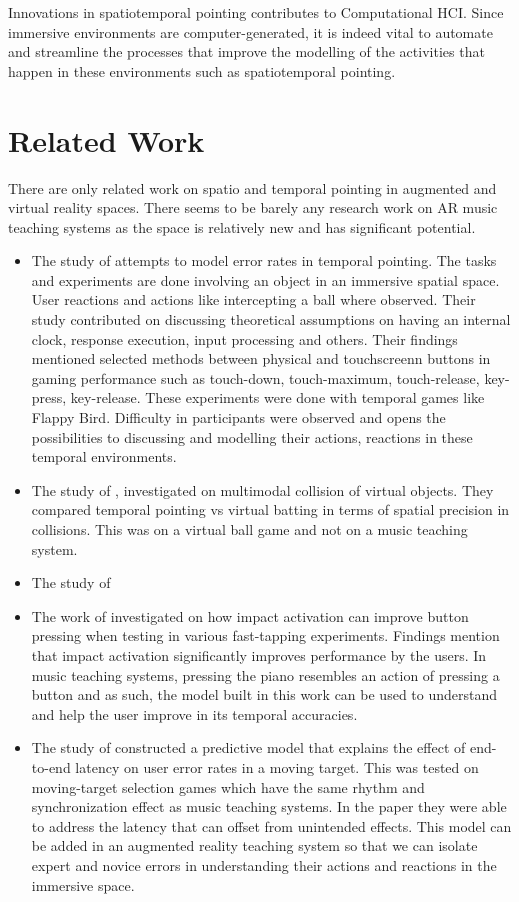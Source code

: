 \documentclass{article}
\begin{document}
Innovations in spatiotemporal pointing contributes to Computational HCI. Since immersive environments are computer-generated, it is indeed vital to automate and streamline the processes that improve the modelling of the activities that happen in these environments such as spatiotemporal pointing. 
\section{Related Work}
There are only related work on spatio and temporal pointing in augmented and virtual reality spaces. There seems to be barely any research work on AR music teaching systems as the space is relatively new and has significant potential.\\
\begin{itemize}
\item The study of \cite{lee2016modelling} attempts to model error rates in temporal pointing. The tasks and experiments are done involving an object in an immersive spatial space. User reactions and actions like intercepting a ball where observed. Their study contributed on discussing theoretical assumptions on having an internal clock, response execution, input processing and others. Their findings mentioned selected methods between physical and touchscreenn buttons in gaming performance such as touch-down, touch-maximum, touch-release, key-press, key-release. These experiments were done with temporal games like Flappy Bird. Difficulty in participants were observed and opens the possibilities to discussing and modelling their actions, reactions in these temporal environments. 
\item The study of \cite{lee2017boxer}, investigated on multimodal collision of virtual objects. They compared temporal pointing vs virtual batting in terms of spatial precision in collisions. This was on a virtual ball game and not on a music teaching system.
\item The study of \cite{lee2018moving}
\item The work of \cite{kim2018impact} investigated on how impact activation can improve button pressing when testing in various fast-tapping experiments. Findings mention that impact activation significantly improves performance by the users. In music teaching systems, pressing the piano resembles an action of pressing a button and as such, the model built in this work can be used to understand and help the user improve in its temporal accuracies. 
\item The study of \cite{lee2019geometrically} constructed a predictive model that explains the effect of end-to-end latency on user error rates in a moving target. This was tested on moving-target selection games which have the same rhythm and synchronization effect as music teaching systems. In the paper they were able to address the latency that can offset from unintended effects. This model can be added in an augmented reality teaching system so that we can isolate expert and novice errors in understanding their actions and reactions in the immersive space. 

\end{itemize}
\end{document}
